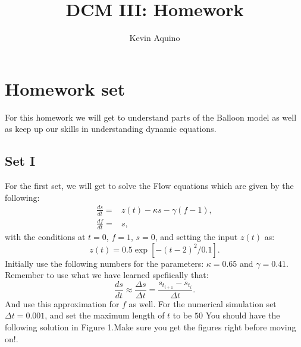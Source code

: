 \documentclass[12pt]{article}
\begin{document}
\title{DCM III: Homework}
\author{Kevin Aquino}
\maketitle

\section{Homework set}
For this homework we will get to understand parts of the Balloon model as well as keep up our skills in understanding dynamic equations.
\subsection{Set I}
For the first set, we will get to solve the Flow equations which are given by the following:
\begin{eqnarray}
\frac{ds}{dt} =& z(t) - \kappa s - \gamma(f-1), \\
\frac{df}{dt} =& s,
\end{eqnarray}
with the conditions at $t=0$, $f=1$, $s=0$, and setting the input $z(t)$ as:
\begin{equation}
z(t) = 0.5\exp\left[-(t-2)^2/0.1\right].
\end{equation}
Initially use the following numbers for the parameters: $\kappa=0.65$ and $\gamma=0.41$. Remember to use what we have learned spefiically that:
\begin{equation}
\frac{ds}{dt} \approx \frac{\Delta s}{\Delta t} = \frac{s_{t_{i+1}} -  s_{t_{i}}}{\Delta t}.
\end{equation}
And use this approximation for $f$ as well. For the numerical simulation set $\Delta t = 0.001$, and set the maximum length of $t$ to be $50$ You should have the following solution in Figure 1.Make sure you get the figures right before moving on!. 
\end{document}
